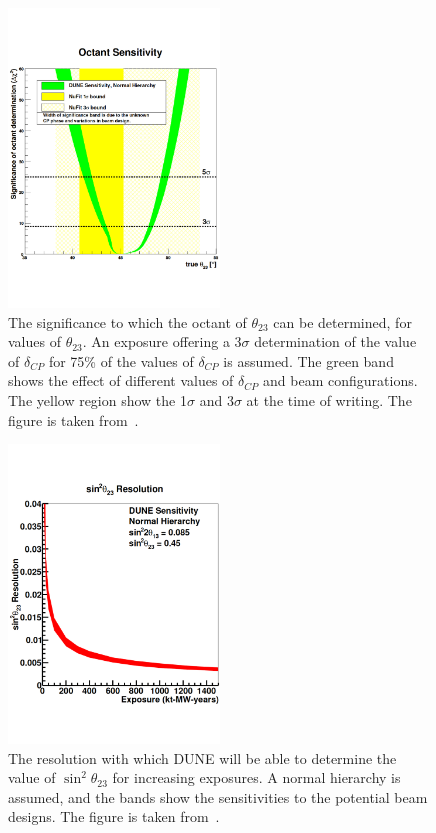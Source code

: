\begin{figure}
  \centering
  \includegraphics[width=0.5\textwidth]{DUNEOctantDetermination}
  \caption[The significance to which the octant of $\theta_{23}$ can be determined, for values of $\theta_{23}$]
          {The significance to which the octant of $\theta_{23}$ can be determined, for values of $\theta_{23}$. An exposure offering a 3$\sigma$ determination of the value of $\delta_{CP}$ for 75\% of the values of $\delta_{CP}$ is assumed. The green band shows the effect of different values of $\delta_{CP}$ and beam configurations. The yellow region show the 1$\sigma$ and 3$\sigma$ at the time of writing. The figure is taken from~\citep{DUNECDR_V2}.}
  \label{fig:DUNEOctantDetermination}
\end{figure}

\begin{figure}
  \centering
  \includegraphics[width=0.5\textwidth]{DUNETheta23Res}
  \caption[The resolution with which DUNE will be able to determine the value of $\sin^{2}\theta_{23}$ for increasing exposures]
          {The resolution with which DUNE will be able to determine the value of $\sin^{2}\theta_{23}$ for increasing exposures. A normal hierarchy is assumed, and the bands show the sensitivities to the potential beam designs. The figure is taken from~\citep{DUNECDR_V2}.}
  \label{fig:DUNETheta23Res}
\end{figure}

